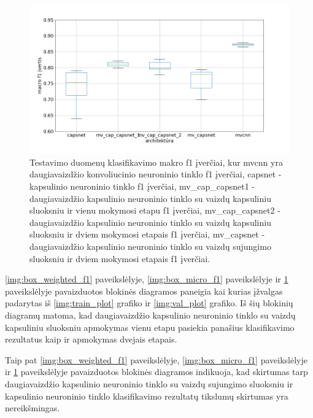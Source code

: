 \begin{figure}[H]
	\centering
	\includegraphics[scale=0.4]{img/boxplot_f1_macro.png}
	\caption{
		Testavimo duomenų klasifikavimo makro f1 įverčiai, kur mvcnn yra daugiavaizdžio konvoliucinio neuroninio tinklo f1 įverčiai, capsnet - kapsulinio neuroninio tinklo f1 įverčiai, mv\_cap\_capsnet1 - daugiavaizdžio kapsulinio neuroninio tinklo su vaizdų kapsuliniu sluoksniu ir vienu mokymosi etapu f1 įverčiai, mv\_cap\_capsnet2 - daugiavaizdžio kapsulinio neuroninio tinklo su vaizdų kapsuliniu sluoksniu ir dviem mokymosi etapais f1 įverčiai,
		mv\_capsnet - daugiavaizdžio kapsulinio neuroninio tinklo su vaizdų sujungimo sluoksniu ir dviem mokymosi etapais f1 įverčiai.
	}
	\label{img:box_macro_f1}
\end{figure}


\ref{img:box_weighted_f1} paveikslėlyje, \ref{img:box_micro_f1} paveikslėlyje ir \ref{img:box_macro_f1} paveikslėlyje pavaizduotos blokinės diagramos paneigia kai kurias įžvalgas padarytas iš \ref{img:train_plot} grafiko ir \ref{img:val_plot} grafiko. Iš šių blokinių diagramų matoma, kad daugiavaizdžio kapsulinio neuroninio tinklo su vaizdų kapsuliniu sluoksniu apmokymas vienu etapu pasiekia panašius klasifikavimo rezultatus kaip ir apmokymas dvejais etapais.

Taip pat \ref{img:box_weighted_f1} paveikslėlyje, \ref{img:box_micro_f1} paveikslėlyje ir \ref{img:box_macro_f1} paveikslėlyje pavaizduotos blokinės diagramos indikuoja, kad skirtumas tarp daugiavaizdžio kapsulinio neuroninio tinklo su vaizdų sujungimo sluoksniu ir kapsulinio neuroninio tinklo klasifikavimo rezultatų tikslumų skirtumas yra nereikšmingas.

